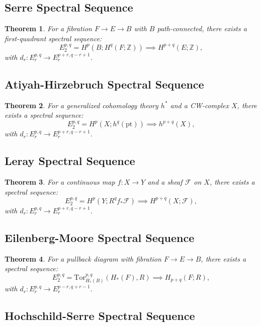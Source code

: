 \documentclass{article}
\theoremstyle{plain}
\newtheorem{theorem}{Theorem}
\theoremstyle{definition}
\newcommand{\Z}{\mathbb{Z}}
\newcommand{\Tor}{\text{Tor}}
\newcommand{\pt}{\text{pt}}
\begin{document}
\subsection{Serre Spectral Sequence}

\begin{theorem}
For a fibration \( F \to E \to B \) with \( B \) path-connected, there exists a first-quadrant spectral sequence:
\[
E_2^{p,q} = H^p(B; H^q(F; \Z)) \implies H^{p+q}(E; \Z),
\]
with \( d_r: E_r^{p,q} \to E_r^{p+r, q-r+1} \).
\end{theorem}

\subsection{Atiyah-Hirzebruch Spectral Sequence}

\begin{theorem}
For a generalized cohomology theory \( h^* \) and a CW-complex \( X \), there exists a spectral sequence:
\[
E_2^{p,q} = H^p(X; h^q(\pt)) \implies h^{p+q}(X),
\]
with \( d_r: E_r^{p,q} \to E_r^{p+r, q-r+1} \).
\end{theorem}

\subsection{Leray Spectral Sequence}

\begin{theorem}
For a continuous map \( f: X \to Y \) and a sheaf \( \mathcal{F} \) on \( X \), there exists a spectral sequence:
\[
E_2^{p,q} = H^p(Y; R^q f_* \mathcal{F}) \implies H^{p+q}(X; \mathcal{F}),
\]
with \( d_r: E_r^{p,q} \to E_r^{p+r, q-r+1} \).
\end{theorem}

\subsection{Eilenberg-Moore Spectral Sequence}

\begin{theorem}
For a pullback diagram with fibration \( F \to E \to B \), there exists a spectral sequence:
\[
E_2^{p,q} = \Tor_{H_*(B)}^{p,q}(H_*(F), R) \implies H_{p+q}(F; R),
\]
with \( d_r: E_r^{p,q} \to E_r^{p-r, q+r-1} \).
\end{theorem}

\subsection{Hochschild-Serre Spectral Sequence}
\end{document}
